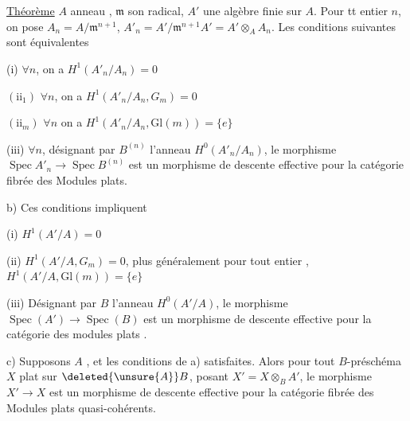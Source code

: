 \uline{Théorème} $A$ anneau ,  $\mathfrak m$ son radical, $A'$ une algèbre
finie sur $A$. Pour tt entier $n$, on pose $A_n=A/\mathfrak m^{n+1}$, $A'_n=A'/\mathfrak m^{n+1}A'=
A'\otimes_A A_n$.  Les conditions suivantes sont équivalentes

(i) $\forall n$, on a $H^1(A'_n/A_n)=0$

$(\mathrm{ii}_1)$ $\forall n$, on a $H^1(A'_n/A_n,G_m)=0$

$(\mathrm{ii}_m)$ $\forall n$ on a $H^1(A'_n/A_n,\mathrm{Gl}(m))=\{e\}$

(iii) $\forall n$, désignant par $B^{(n)}$ l'anneau $H^0(A'_n/A_n)$,
le morphisme $\operatorname{Spec} A'_n\to\operatorname{Spec} B^{(n)}$ est un morphisme
de descente effective pour la catégorie fibrée des
Modules  plats.

b) Ces conditions impliquent

(i) $H^1(A'/A)=0$

(ii) $H^1(A'/A,G_m)=0$, plus généralement pour tout
entier , $H^1(A'/A,\mathrm{Gl}(m))=\{e\}$

(iii) Désignant par $B$ l'anneau $H^0(A'/A)$,
le morphisme $\operatorname{Spec}(A')\to\operatorname{Spec}(B)$ est un
morphisme de descente effective pour la catégorie
des modules plats .

c) Supposons $A$ , et les conditions de
a) satisfaites. Alors pour tout $B$-préschéma
$X$ plat sur $\deleted{\unsure{A}}B$, posant $X'=X\otimes_B A'$, le morphisme
$X'\to X$ est un morphisme de descente effective
pour la catégorie fibrée des Modules plats quasi-cohérents.
